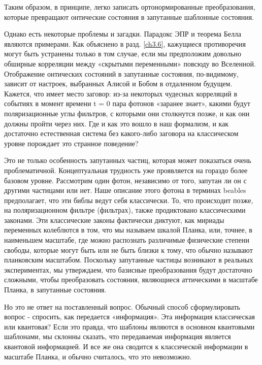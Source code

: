 \documentclass[main.tex]{subfiles}
\begin{document}
Таким образом, в принципе, легко записать ортонормированные преобразования, которые превращают онтические состояния в запутанные шаблонные состояния.

Однако есть некоторые проблемы и загадки. Парадокс ЭПР и теорема Белла являются примерами. Как объяснено в разд. \ref{ch3.6}, кажущиеся противоречия могут быть устранены только в том случае, если мы предположим довольно обширные корреляции между «скрытыми переменными» повсюду во Вселенной. Отображение онтических состояний в запутанные состояния, по-видимому, зависит от настроек, выбранных Алисой и Бобом в отдаленном будущем.
Кажется, что имеет место заговор: из-за некоторых чудесных корреляций в событиях в момент времени t = 0 пара фотонов «заранее знает», какими будут поляризационные углы фильтров, с которыми они столкнутся позже, и как они должны пройти через них. Где и как это вошло в наш формализм, и как достаточно естественная система без какого-либо заговора на классическом уровне порождает это странное поведение?

Это не только особенность запутанных частиц, которая может показаться очень проблематичной. Концептуальная трудность уже проявляется на гораздо более базовом уровне. Рассмотрим один фотон, независимо от того, запутан ли он с другими частицами или нет. Наше описание этого фотона в терминах beables предполагает, что эти библы ведут себя классически. То, что происходит позже, на поляризационном фильтре (фильтрах), также продиктовано классическими законами. Эти классические законы фактически диктуют, как мириады переменных колеблются в том, что мы называем шкалой Планка, или, точнее, в наименьшем масштабе, где можно распознать различимые физические степени свободы, которые могут быть или не быть близки к тому, что обычно называют планковским масштабом. Поскольку запутанные частицы возникают в реальных экспериментах, мы утверждаем, что базисные преобразования будут достаточно сложными, чтобы преобразовать состояния, являющиеся аттическими в масштабе Планка, в запутанные состояния.

Но это не ответ на поставленный вопрос. Обычный способ сформулировать вопрос - спросить, как передается «информация». Эта информация классическая или квантовая? Если это правда, что шаблоны являются в основном квантовыми шаблонами, мы склонны сказать, что передаваемая информация является квантовой информацией. И все же она сводится к классической информации в масштабе Планка, и обычно считалось, что это невозможно.
\end{document}
